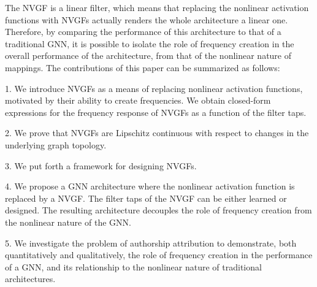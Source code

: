 The NVGF is a linear filter, which means that replacing the nonlinear activation functions with NVGFs actually renders the whole architecture a linear one. Therefore, by comparing the performance of this architecture to that of a traditional GNN, it is possible to isolate the role of frequency creation in the overall performance of the architecture, from that of the nonlinear nature of mappings. The contributions of this paper can be summarized as follows:

\begin{list}{}{
        \setlength{\labelwidth}{20pt}
        \setlength{\leftmargin}{2pt}
        \setlength{\labelsep}{1pt}
        \setlength{\itemsep}{-1pt}
        \setlength{\topsep}{-1pt}
        \setlength{\parskip}{-1pt}
    }

    \item[1.] We introduce NVGFs as a means of replacing nonlinear activation functions, motivated by their ability to create frequencies. We obtain closed-form expressions for the frequency response of NVGFs as a function of the filter taps.
    \item[2.] We prove that NVGFs are Lipschitz continuous with respect to changes in the underlying graph topology.
    \item[3.] We put forth a framework for designing NVGFs.%
    \item[4.] We propose a GNN architecture where the nonlinear activation function is replaced by a NVGF. The filter taps of the NVGF can be either learned or designed. The resulting architecture decouples the role of frequency creation from the nonlinear nature of the GNN.
    \item[5.] We investigate the problem of authorship attribution to demonstrate, both quantitatively and qualitatively, the role of frequency creation in the performance of a GNN, and its relationship to the nonlinear nature of traditional architectures.

\end{list}
\else
